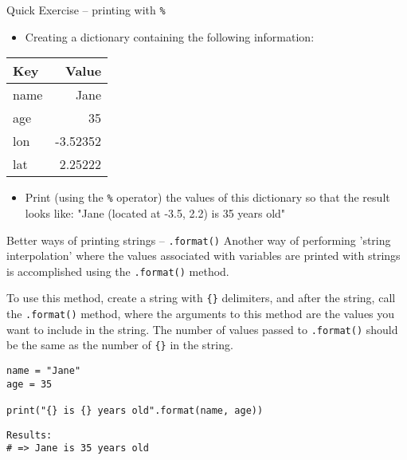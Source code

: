 \documentclass[10pt]{beamer}
\begin{document}
\begin{frame}[label={sec:org75dc67c},fragile]{Quick Exercise -- printing with \texttt{\%}}
 \begin{itemize}
\item Creating a dictionary containing the following information:
\end{itemize}

\begin{center}
\begin{tabular}{lr}
Key & Value\\
\hline
name & Jane\\
age & 35\\
lon & -3.52352\\
lat & 2.25222\\
\end{tabular}
\end{center}

\begin{itemize}
\item Print (using the \texttt{\%} operator) the values of this dictionary so that the result looks
like: "Jane (located at -3.5, 2.2) is 35 years old"
\end{itemize}
\end{frame}

\begin{frame}[label={sec:org598c8ae},fragile]{Better ways of printing strings -- \texttt{.format()}}
 Another way of performing 'string interpolation' where the values associated with
variables are printed with strings is accomplished using the \texttt{.format()} method.

To use this method, create a string with \texttt{\{\}} delimiters, and after the string, call
the \texttt{.format()} method, where the arguments to this method are the values you want to
include in the string. The number of values passed to \texttt{.format()} should be the same as
the number of \texttt{\{\}} in the string.

\begin{verbatim}
name = "Jane"
age = 35

print("{} is {} years old".format(name, age))
\end{verbatim}

\begin{verbatim}
Results: 
# => Jane is 35 years old
\end{verbatim}
\end{frame}
\end{document}
